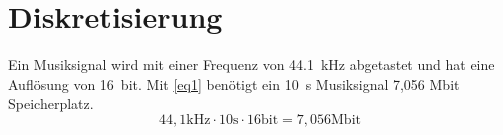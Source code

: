 \section{Diskretisierung}
Ein Musiksignal wird mit einer Frequenz von \SI{44.1}{\kilo \hertz} abgetastet und hat eine Auflösung von \SI{16}{bit}. Mit \autoref{eq1} benötigt ein \SI{10}{\second} Musiksignal 7,056 Mbit Speicherplatz.
\begin{equation}
\label{eq1}
44,1\text{kHz} \cdot 10\text{s}\cdot 16\text{bit}=7,056\text{Mbit}
\end{equation}